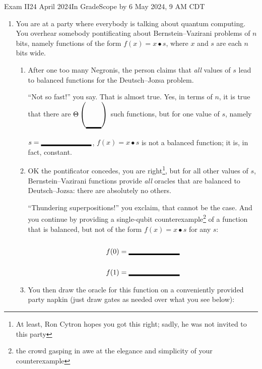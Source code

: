 \documentclass[12pt]{article}
\newcommand{\Blank}[1][1in]{\mbox{\vrule width #1 depth 2pt}\vrule width 0pt height 2.2em}
\begin{document}
\begin{assignment}{Exam II}{24 April 2024}{In GradeScope by 6 May 2024, 9 AM CDT}
\begin{enumerate}
\begin{enumerate}
    \item This is an instance of Grover for a function, where the input values are~\Blank[3em]{} bits wide.
    \item From $\ket{\psi_{f}}$ shown above, what is the secret  (the input value that Grover is trying to find)?~\Blank{}
    \item This is the first step of the \Blank{} iteration of the algorithm.
    \item When we complete this iteration by performing diffusion, the amplitude on  will be approximately \Blank{}, because it increases each iteration on a problem of this size by approximately~\Blank{}.
    
    
\end{enumerate}

\clearpage\item{} You are at a party where everybody is talking about quantum computing.  You overhear somebody pontificating about Bernstein--Vazirani problems of $n$ bits, namely functions of the form
\( f(x) = x \bullet s \),
where $x$ and $s$ are each $n$ bits wide.  

\begin{enumerate}
\item{} After one too many Negronis, the person claims that \emph{all} values of $s$ lead to balanced functions for the Deutsch--Jozsa problem.

``Not so fast!'' you say.  That is almost true.  Yes, in terms of $n$, it is true that there are $\Theta\left(\mbox{\vrule width 0pt height 2em depth 0pt\raisebox{-1.5em}{\Blank[2.2em]}}\right)$ such functions, but for one value of $s$, namely $s=\Blank{}$, $f(x)=x\bullet s$ is not a balanced function; it is, in fact, constant.

\item{} OK the pontificator concedes, you are right\footnote{At least, Ron Cytron hopes you got this right; sadly, he was not invited to this party}, but for all other values of $s$,  Bernstein--Vazirani functions provide \emph{all} oracles that are balanced to Deutsch--Jozsa: there are absolutely no others.

``Thundering superpositions!'' you exclaim, that cannot be the case.  And you continue by providing a single-qubit counterexample\footnote{the crowd gasping in awe at the elegance and simplicity of your counterexample} of a function that is balanced, but not of the form $f(x)=x\bullet s$ for any $s$:
\begin{align*}
    f(0) &= \Blank{} \\
    f(1) &= \Blank{}
\end{align*}
\item{} You then draw the oracle for this function on a conveniently provided party napkin (just draw gates as needed over what you see below):


\end{enumerate}
\end{enumerate}
\end{assignment}
\end{document}
